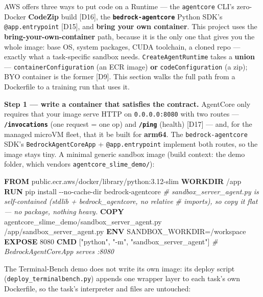 \documentclass[
  paper=a4,
  ,captions=tableheading
]{scrartcl}
\newenvironment{Shaded}{}{}
\newcommand{\AttributeTok}[1]{\textcolor[rgb]{0.49,0.56,0.16}{#1}}
\newcommand{\CommentTok}[1]{\textcolor[rgb]{0.38,0.63,0.69}{\textit{#1}}}
\newcommand{\ExtensionTok}[1]{#1}
\newcommand{\KeywordTok}[1]{\textcolor[rgb]{0.00,0.44,0.13}{\textbf{#1}}}
\newcommand{\NormalTok}[1]{#1}
\newcommand{\StringTok}[1]{\textcolor[rgb]{0.25,0.44,0.63}{#1}}
\begin{document}
AWS offers three ways to put code on a Runtime --- the
\texttt{agentcore} CLI's zero-Docker \textbf{CodeZip} build {[}D16{]},
the \textbf{\texttt{bedrock-agentcore}} Python SDK's
\texttt{@app.entrypoint} {[}D15{]}, and \textbf{bring your own
container}. This project uses the \textbf{bring-your-own-container}
path, because it is the only one that gives you the whole image: base
OS, system packages, CUDA toolchain, a cloned repo --- exactly what a
task-specific sandbox needs. \texttt{CreateAgentRuntime} takes a
\textbf{union} --- \texttt{containerConfiguration} (an ECR image)
\textbf{or} \texttt{codeConfiguration} (a zip); BYO container is the
former {[}D9{]}. This section walks the full path from a Dockerfile to a
training run that uses it.

\textbf{Step 1 --- write a container that satisfies the contract.}
AgentCore only requires that your image serve HTTP on
\texttt{0.0.0.0:8080} with two routes --- \textbf{\texttt{/invocations}}
(one request = one op) and \textbf{\texttt{/ping}} (health) {[}D17{]}
--- and, for the managed microVM fleet, that it be built for
\textbf{arm64}. The \texttt{bedrock-agentcore} SDK's
\texttt{BedrockAgentCoreApp} + \texttt{@app.entrypoint} implement both
routes, so the image stays tiny. A minimal generic sandbox image (build
context: the demo folder, which vendors
\texttt{agentcore\_slime\_demo/}):

\begin{Shaded}
\begin{Highlighting}[]
\KeywordTok{FROM}\NormalTok{ public.ecr.aws/docker/library/python:3.12{-}slim}
\KeywordTok{WORKDIR}\NormalTok{ /app}
\KeywordTok{RUN} \ExtensionTok{pip}\NormalTok{ install }\AttributeTok{{-}{-}no{-}cache{-}dir}\NormalTok{ bedrock{-}agentcore}
\CommentTok{\# sandbox\_server\_agent.py is self{-}contained (stdlib + bedrock\_agentcore, no relative}
\CommentTok{\# imports), so copy it flat — no package, nothing heavy.}
\KeywordTok{COPY}\NormalTok{ agentcore\_slime\_demo/sandbox\_server\_agent.py /app/sandbox\_server\_agent.py}
\KeywordTok{ENV}\NormalTok{ SANDBOX\_WORKDIR=/workspace}
\KeywordTok{EXPOSE}\NormalTok{ 8080}
\KeywordTok{CMD}\NormalTok{ [}\StringTok{"python"}\NormalTok{, }\StringTok{"{-}m"}\NormalTok{, }\StringTok{"sandbox\_server\_agent"}\NormalTok{]      }\CommentTok{\# BedrockAgentCoreApp serves :8080}
\end{Highlighting}
\end{Shaded}

The Terminal-Bench demo does not write its own image: its deploy script
(\texttt{deploy\_terminalbench.py}) appends one wrapper layer to each
task's own Dockerfile, so the task's interpreter and files are
untouched:
\end{document}
